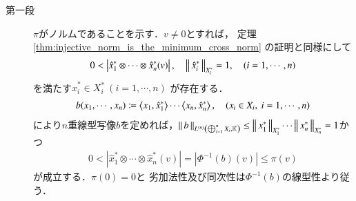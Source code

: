 	\begin{prf}\mbox{}
		\begin{description}
			\item[第一段]
				$\pi$がノルムであることを示す．$v \neq 0$とすれば，
				定理\ref{thm:injective_norm_is_the_minimum_cross_norm}
				の証明と同様にして
				\begin{align}
					0 < \left| \hat{x}_1^* \otimes \cdots \otimes \hat{x}_n^* (v) \right|,
					\quad \Norm{\hat{x}^*_i}{X^*_i} = 1,
					\quad (i=1,\cdots,n)
				\end{align}
				を満たす$\hat{x}^*_i \in X^*_i\ (i=1,\cdots,n)$
				が存在する．
				\begin{align}
					b(x_1,\cdots,x_n) 
					\coloneqq \inprod<x_1,\hat{x}_1^*> \cdots \inprod<x_n,\hat{x}_n^*>,
					\quad (x_i \in X_i,\ i=1,\cdots,n)
				\end{align}
				により$n$重線型写像$b$を定めれば，$\Norm{b}{\ContLn{\bigoplus_{i=1}^n X_i}{\K}{n}}
				\leq \Norm{x_1^*}{X_1^*} \cdots \Norm{x_n^*}{X_n^*} = 1$かつ
				\begin{align}
					0 < \left| \hat{x}_1^* \otimes \cdots \otimes \hat{x}_n^* (v) \right| 
					= |\Phi^{-1}(b)(v)| \leq \pi(v)
				\end{align}
				が成立する．$\pi(0) = 0$と
				劣加法性及び同次性は$\Phi^{-1}(b)$の線型性より従う．
			

\end{description}
\end{prf}
